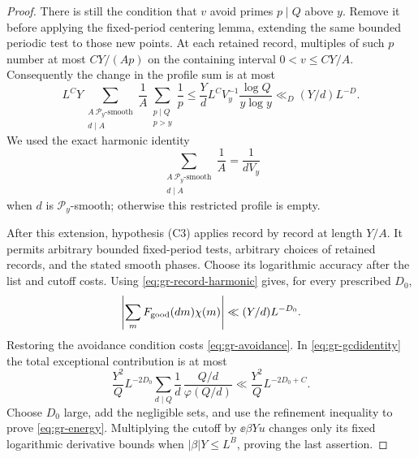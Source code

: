 \begin{proof}
There is still the condition that \(v\) avoid primes \(p\mid Q\)
above \(y\).  Remove it before applying the fixed-period centering
lemma, extending the same bounded periodic test to those new points.
At each retained record, multiples of such \(p\) number at most
\(CY/(Ap)\) on the containing interval \(0<v\le CY/A\).
Consequently the change in the profile sum is at most
\begin{equation}
 L^CY\sum_{\substack{A\ \mathcal P_y\text{-smooth}\\d\mid A}}\frac1A
                \sum_{\substack{p\mid Q\\p>y}}\frac1p
 \le \frac{Y}{d}L^CV_y^{-1}\frac{\log Q}{y\log y}
 \ll_D (Y/d)L^{-D}.                                  \label{eq:gr-avoidance}
\end{equation}
We used the exact harmonic identity
\begin{equation}
 \sum_{\substack{A\ \mathcal P_y\text{-smooth}\\d\mid A}}\frac1A
                       =\frac1{dV_y}                 \label{eq:gr-record-harmonic}
\end{equation}
when \(d\) is \(\mathcal P_y\)-smooth; otherwise this restricted profile is empty.

After this extension, hypothesis \textup{(C3)} applies record by
record at length \(Y/A\).
It permits arbitrary bounded fixed-period tests, arbitrary choices
of retained records, and the stated smooth phases.
Choose its logarithmic accuracy after the list and cutoff costs.
Using \eqref{eq:gr-record-harmonic} gives, for every prescribed \(D_0\),
\begin{equation}
            \left|\sum_mF_{\rm good}(dm)\chi(m)\right|
                         \ll (Y/d)L^{-D_0}.          \label{eq:gr-exceptional}
\end{equation}
Restoring the avoidance condition costs \eqref{eq:gr-avoidance}.
In \eqref{eq:gr-gcdidentity} the total exceptional contribution is at most
\begin{equation}
 \frac{Y^2}{Q}L^{-2D_0}
           \sum_{d\mid Q}\frac1d\,\frac{Q/d}{\varphi(Q/d)}
                     \ll \frac{Y^2}{Q}L^{-2D_0+C}.   \label{eq:gr-exceptionalenergy}
\end{equation}
Choose \(D_0\) large, add the negligible sets, and use the refinement
inequality to prove \eqref{eq:gr-energy}.
Multiplying the cutoff by \(\ee{\beta Yu}\) changes only its fixed
logarithmic derivative bounds when \(|\beta|Y\le L^B\), proving the
last assertion.
\end{proof}

